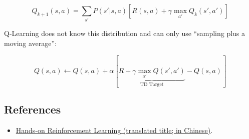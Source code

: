 \[
Q_{k+1}(s,a)=\sum_{s'}P(s'|s,a)[R(s,a)+\gamma\max_{a'}Q_k(s',a')]
\]

Q-Learning does not know this distribution and can only use ``sampling plus a moving average'':

\[
Q(s,a)\leftarrow Q(s,a)+\alpha[\underbrace{R+\gamma\max_{a'}Q(s',a')}_{\text{TD Target}}-Q(s,a)]
\]

\FloatBarrier
{}
\hypertarget{references-47}{%
\subsection{References}\label{references-47}}

\vspace{0.25em}
\begin{itemize}
\tightlist
\item
  \href{https://hrl.boyuai.com/}{Hands-on Reinforcement Learning (translated title; in Chinese)}.
\end{itemize}

\clearpage
